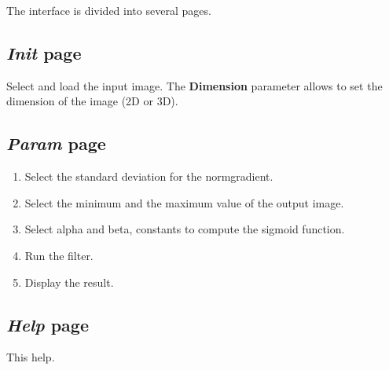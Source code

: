 \documentclass{article}
\begin{document}
The interface is divided into several pages.

\subsection{\emph{Init} page}

Select and load the input image.
The {\bf Dimension} parameter allows to set the dimension of the image (2D or 3D).

\subsection{\emph{Param} page}

\begin{enumerate}
  \item Select the standard deviation for the normgradient.
  \item Select the minimum and the maximum value of the output image.
  \item Select alpha and beta, constants to compute the sigmoid function.
  \item Run the filter.
  \item Display the result.
\end{enumerate}


\subsection{\emph{Help} page}
This help.
\end{document}
